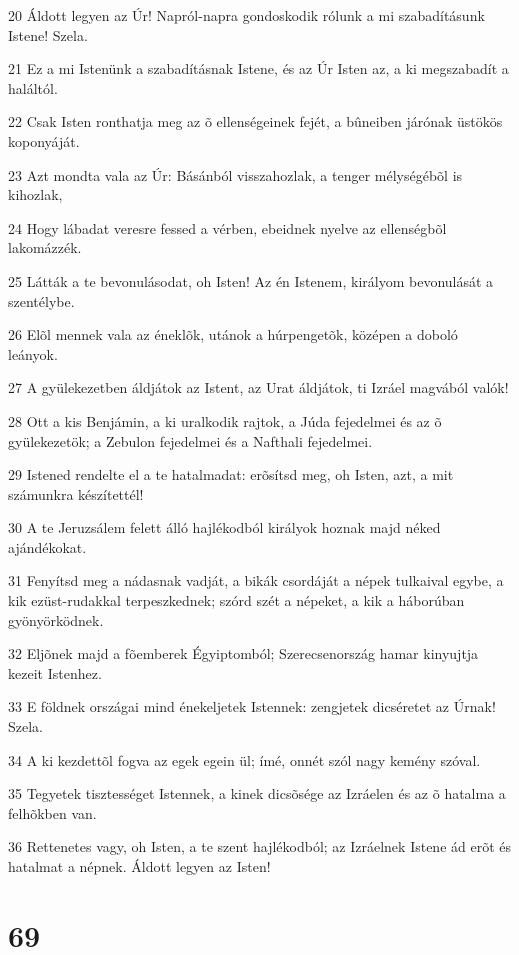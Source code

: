 \par 20 Áldott legyen az Úr! Napról-napra gondoskodik rólunk a mi szabadításunk Istene! Szela.
\par 21 Ez a mi Istenünk a szabadításnak Istene, és az Úr Isten az, a ki megszabadít a haláltól.
\par 22 Csak Isten ronthatja meg az õ ellenségeinek fejét, a bûneiben járónak üstökös koponyáját.
\par 23 Azt mondta vala az Úr: Básánból visszahozlak, a tenger mélységébõl is kihozlak,
\par 24 Hogy lábadat veresre fessed a vérben, ebeidnek nyelve az ellenségbõl lakomázzék.
\par 25 Látták a te bevonulásodat, oh Isten! Az én Istenem, királyom bevonulását a szentélybe.
\par 26 Elõl mennek vala az éneklõk, utánok a húrpengetõk, középen a doboló leányok.
\par 27 A gyülekezetben áldjátok az Istent, az Urat áldjátok, ti Izráel magvából valók!
\par 28 Ott a kis Benjámin, a ki uralkodik rajtok, a Júda fejedelmei és az õ gyülekezetök; a Zebulon fejedelmei és a Nafthali fejedelmei.
\par 29 Istened rendelte el a te hatalmadat: erõsítsd meg, oh Isten, azt, a mit számunkra készítettél!
\par 30 A te Jeruzsálem felett álló hajlékodból királyok hoznak majd néked ajándékokat.
\par 31 Fenyítsd meg a nádasnak vadját, a bikák csordáját a népek tulkaival egybe, a kik ezüst-rudakkal terpeszkednek; szórd szét a népeket, a kik a háborúban gyönyörködnek.
\par 32 Eljõnek majd a fõemberek Égyiptomból; Szerecsenország hamar kinyujtja kezeit Istenhez.
\par 33 E földnek országai mind énekeljetek Istennek: zengjetek dicséretet az Úrnak! Szela.
\par 34 A ki kezdettõl fogva az egek egein ül; ímé, onnét szól nagy kemény szóval.
\par 35 Tegyetek tisztességet Istennek, a kinek dicsõsége az Izráelen és az õ hatalma a felhõkben van.
\par 36 Rettenetes vagy, oh Isten, a te szent hajlékodból; az Izráelnek Istene ád erõt és hatalmat a népnek. Áldott legyen az Isten!

\chapter{69}

